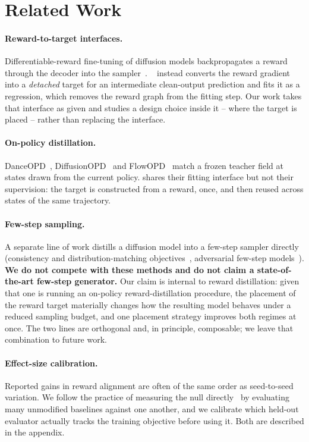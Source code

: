 \section{Related Work}
\label{sec:related}

\paragraph{Reward-to-target interfaces.} Differentiable-reward fine-tuning of diffusion
models backpropagates a reward through the decoder into the
sampler~\citep{refl2023,draft2023}. \opsd~\citep{opsd2026} instead converts the reward
gradient into a \emph{detached} target for an intermediate clean-output prediction and
fits it as a regression, which removes the reward graph from the fitting step. Our work
takes that interface as given and studies a design choice inside it -- where the target is
placed -- rather than replacing the interface.

\paragraph{On-policy distillation.} DanceOPD~\citep{danceopd2026},
DiffusionOPD~\citep{diffusionopd2026} and FlowOPD~\citep{flowopd2026} match a frozen
teacher field at states drawn from the current policy. \MSP shares their fitting interface
but not their supervision: the target is constructed from a reward, once, and then reused
across states of the same trajectory.

\paragraph{Few-step sampling.} A separate line of work distills a diffusion model into a
few-step sampler directly (consistency and distribution-matching
objectives~\citep{lcm2023,dmd2024}, adversarial few-step
models~\citep{sdxlturbo2023}). \textbf{We do not compete with these methods and do not
claim a state-of-the-art few-step generator.} Our claim is internal to reward
distillation: given that one is running an on-policy reward-distillation procedure, the
placement of the reward target materially changes how the resulting model behaves under a
reduced sampling budget, and one placement strategy improves both regimes at once. The two
lines are orthogonal and, in principle, composable; we leave that combination to future
work.

\paragraph{Effect-size calibration.} Reported gains in reward alignment are often of the
same order as seed-to-seed variation. We follow the practice of measuring the null
directly~\citep{bouthillier2021accounting} by evaluating many unmodified baselines against
one another, and we calibrate which held-out evaluator actually tracks the training
objective before using it. Both are described in the appendix.
